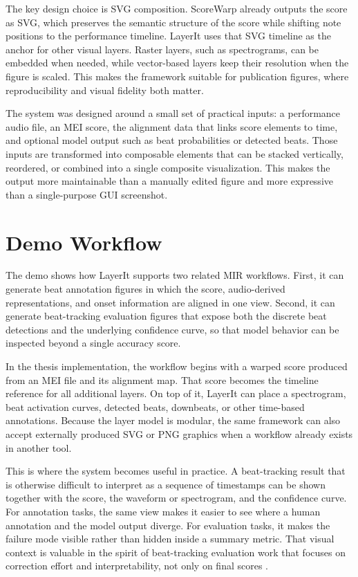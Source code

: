 \documentclass{article}
\begin{document}
The key design choice is SVG composition. ScoreWarp already outputs the score as SVG, which preserves the semantic structure of the score while shifting note positions to the performance timeline. LayerIt uses that SVG timeline as the anchor for other visual layers. Raster layers, such as spectrograms, can be embedded when needed, while vector-based layers keep their resolution when the figure is scaled. This makes the framework suitable for publication figures, where reproducibility and visual fidelity both matter.

The system was designed around a small set of practical inputs: a performance audio file, an MEI score, the alignment data that links score elements to time, and optional model output such as beat probabilities or detected beats. Those inputs are transformed into composable elements that can be stacked vertically, reordered, or combined into a single composite visualization. This makes the output more maintainable than a manually edited figure and more expressive than a single-purpose GUI screenshot.

\section{Demo Workflow}

The demo shows how LayerIt supports two related MIR workflows. First, it can generate beat annotation figures in which the score, audio-derived representations, and onset information are aligned in one view. Second, it can generate beat-tracking evaluation figures that expose both the discrete beat detections and the underlying confidence curve, so that model behavior can be inspected beyond a single accuracy score.

In the thesis implementation, the workflow begins with a warped score produced from an MEI file and its alignment map. That score becomes the timeline reference for all additional layers. On top of it, LayerIt can place a spectrogram, beat activation curves, detected beats, downbeats, or other time-based annotations. Because the layer model is modular, the same framework can also accept externally produced SVG or PNG graphics when a workflow already exists in another tool.

This is where the system becomes useful in practice. A beat-tracking result that is otherwise difficult to interpret as a sequence of timestamps can be shown together with the score, the waveform or spectrogram, and the confidence curve. For annotation tasks, the same view makes it easier to see where a human annotation and the model output diverge. For evaluation tasks, it makes the failure mode visible rather than hidden inside a summary metric. That visual context is valuable in the spirit of beat-tracking evaluation work that focuses on correction effort and interpretability, not only on final scores \cite{pintoShiftIfYoua}.
\end{document}

